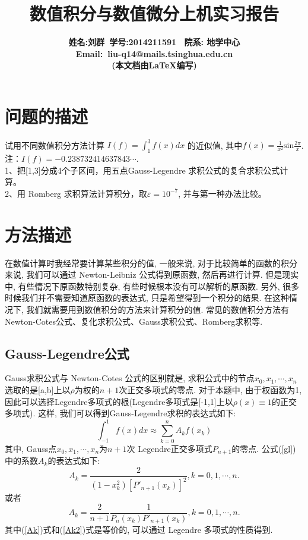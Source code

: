 \documentclass[a4paper]{article}
\begin{document}
\begin{spacing}{1.5}
\begin{CJK*}{GBK}{song}
\title{\bf{数值积分与数值微分上机实习报告}}
\author{\bf{姓名:刘群\ 学号:2014211591 \ 院系: 地学中心}\\ \bf{Email}:\ liu-q14@mails.tsinghua.edu.cn \\ (本文档由\LaTeX{}编写)}
\date{}
\maketitle
\section{问题的描述}
试用不同数值积分方法计算 $I(f) =\int_1^3 f(x)dx$ 的近似值, 其中$f(x) = \frac{1}{x^2}\text{sin}\frac{2\pi}{x}$.
注：$I(f) =-0.238732414637843\cdots$.\\
1、把[1,3]分成4个子区间，用五点Gauss-Legendre 求积公式的复合求积公式计算。\\
2、用 Romberg 求积算法计算积分，取$\varepsilon= 10^{-7}$, 并与第一种办法比较。
\section{方法描述}
在数值计算时我经常要计算某些积分的值, 一般来说, 对于比较简单的函数的积分来说, 我们可以通过 Newton-Leibniz 公式得到原函数, 然后再进行计算. 但是现实中, 有些情况下原函数特别复杂, 有些时候根本没有可以解析的原函数. 另外, 很多时候我们并不需要知道原函数的表达式, 只是希望得到一个积分的结果. 在这种情况下, 我们就需要用到数值积分的方法来计算积分的值. 常见的数值积分方法有 Newton-Cotes公式、复化求积公式、Gauss求积公式、Romberg求积等.

\subsection{Gauss-Legendre公式}
Gauss求积公式与 Newton-Cotes 公式的区别就是, 求积公式中的节点$x_0, x_1, \cdots, x_n$ 选取的是[a,b]上以$\rho$为权的$n+1$次正交多项式的零点. 对于本题中, 由于权函数为1, 因此可以选择Legendre多项式的根(Legendre多项式是[-1,1]上以$\rho(x)\equiv 1$的正交多项式). 这样, 我们可以得到Gauss-Legendre求积的表达式如下:
\begin{equation}\label{gl}
  \int_{-1}^1 f(x)dx \approx \sum_{k=0}^nA_kf(x_k)
\end{equation}
其中, Gauss点$x_0,x_1,\cdots, x_n$为$n+1$次 Legendre正交多项式$P_{n+1}$的零点. 公式(\ref{gl})中的系数$A_k$的表达式如下:
\begin{equation}\label{Ak}
  A_k =\frac{2}{(1-x_k^2)[P'_{n+1}(x_k)]^2}, k=0, 1, \cdots, n.
\end{equation}
或者
\begin{equation}\label{Ak2}
  A_k =\frac{2}{n+1}\frac{1}{P_{n}(x_k)P'_{n+1}(x_k)}, k=0, 1, \cdots, n.
\end{equation}
其中(\ref{Ak})式和(\ref{Ak2})式是等价的, 可以通过 Legendre 多项式的性质得到.\par


\end{CJK*}
\end{spacing}
\end{document}

